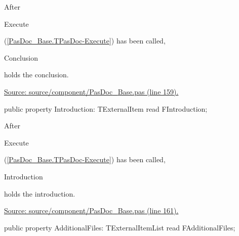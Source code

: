 \documentclass{report}
\newif\ifpdf
\begin{document}
\begin{list}{}
\begin{flushleft}
\ifpdf
\end{flushleft}
\fi


\par After \begin{ttfamily}Execute\end{ttfamily}(\ref{PasDoc_Base.TPasDoc-Execute}) has been called, \begin{ttfamily}Conclusion\end{ttfamily} holds the conclusion.\par
\href{https://github.com/pasdoc/pasdoc/blob/master/source/component/PasDoc_Base.pas#L159}{Source: source/component/PasDoc{\_}Base.pas (line 159).}\label{PasDoc_Base.TPasDoc-Introduction}
\item[\textbf{Introduction}\hfill]
\ifpdf
\begin{flushleft}
\fi
\begin{ttfamily}
public property Introduction: TExternalItem read FIntroduction;\end{ttfamily}

\ifpdf
\end{flushleft}
\fi


\par After \begin{ttfamily}Execute\end{ttfamily}(\ref{PasDoc_Base.TPasDoc-Execute}) has been called, \begin{ttfamily}Introduction\end{ttfamily} holds the introduction.\par
\href{https://github.com/pasdoc/pasdoc/blob/master/source/component/PasDoc_Base.pas#L161}{Source: source/component/PasDoc{\_}Base.pas (line 161).}\label{PasDoc_Base.TPasDoc-AdditionalFiles}
\item[\textbf{AdditionalFiles}\hfill]
\ifpdf
\begin{flushleft}
\fi
\begin{ttfamily}
public property AdditionalFiles: TExternalItemList read FAdditionalFiles;\end{ttfamily}

\ifpdf
\end{flushleft}
\fi



\end{list}
\end{document}
